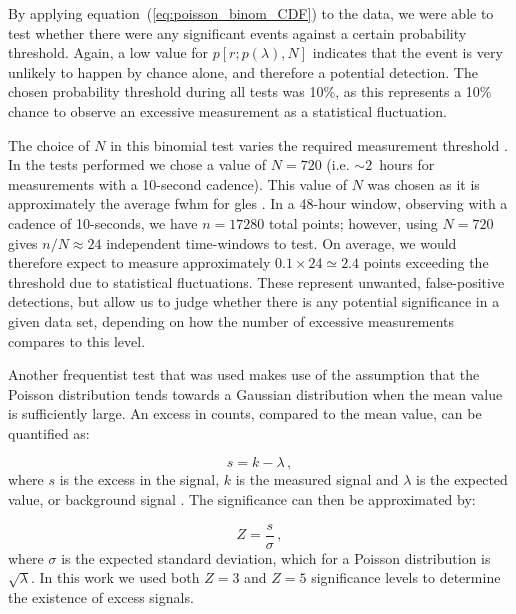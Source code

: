 By applying equation~(\ref{eq:poisson_binom_CDF}) to the data, we were able to test whether there were any significant events against a certain probability threshold. Again, a low value for $p[r; p(\lambda), N]$ indicates that the event is very unlikely to happen by chance alone, and therefore a potential detection. The chosen probability threshold during all tests was 10\%, as this represents a 10\% chance to observe an excessive measurement as a statistical fluctuation.

The choice of $N$ in this binomial test varies the required measurement threshold \citep{basu_asteroseismic_2017}. In the tests performed we chose a value of $N=720$ (i.e. $\sim2$~hours for measurements with a 10-second cadence). This value of $N$ was chosen as it is approximately the average \gls{fwhm} for \glspl{gle} \citep{strauss_pulse_2017}. In a 48-hour window, observing with a cadence of 10-seconds, we have $n=17280$ total points; however, using $N=720$ gives $n/N\approx24$ independent time-windows to test. On average, we would therefore expect to measure approximately $0.1 \times 24 \simeq 2.4$ points exceeding the threshold due to statistical fluctuations. These represent unwanted, false-positive detections, but allow us to judge whether there is any potential significance in a given data set, depending on how the number of excessive measurements compares to this level.


Another frequentist test that was used makes use of the assumption that the Poisson distribution tends towards a Gaussian distribution when the mean value is sufficiently large. An excess in counts, compared to the mean value, can be quantified as:

\begin{equation}
s = k - \lambda \, ,
\label{eq:poisson_excess}
\end{equation}
%
where $s$ is the excess in the signal, $k$ is the measured signal and $\lambda$ is the expected value, or background signal \citep{lista_statistical_2016}. The significance can then be approximated by:

\begin{equation}
Z = \frac{s}{\sigma} \, ,
\label{eq:poisson_significance}
\end{equation}
%
where $\sigma$ is the expected standard deviation, which for a Poisson distribution is $\sqrt{\lambda}$. In this work we used both $Z = 3$ and $Z = 5$ significance levels to determine the existence of excess signals.

